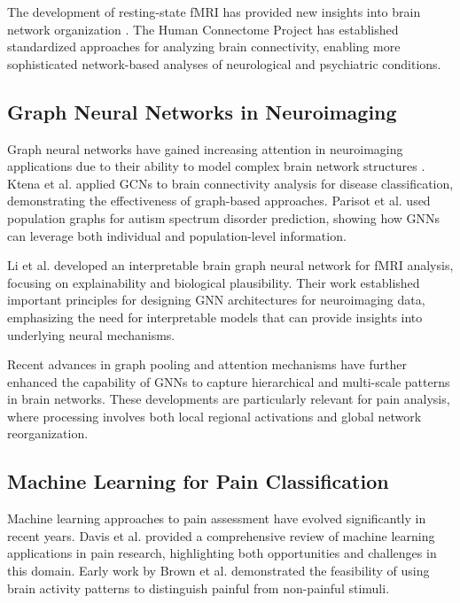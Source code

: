 \documentclass[10pt,journal,compsoc]{IEEEtran}
\begin{document}
The development of resting-state fMRI has provided new insights into brain network organization \cite{greicius2003functional,fox2009default}. The Human Connectome Project \cite{van2013human,smith2013resting} has established standardized approaches for analyzing brain connectivity, enabling more sophisticated network-based analyses of neurological and psychiatric conditions.

\subsection{Graph Neural Networks in Neuroimaging}

Graph neural networks have gained increasing attention in neuroimaging applications due to their ability to model complex brain network structures \cite{zhou2020graph}. Ktena et al. \cite{ktena2018distance} applied GCNs to brain connectivity analysis for disease classification, demonstrating the effectiveness of graph-based approaches. Parisot et al. \cite{parisot2018spectral} used population graphs for autism spectrum disorder prediction, showing how GNNs can leverage both individual and population-level information.

Li et al. \cite{li2021braingnn} developed an interpretable brain graph neural network for fMRI analysis, focusing on explainability and biological plausibility. Their work established important principles for designing GNN architectures for neuroimaging data, emphasizing the need for interpretable models that can provide insights into underlying neural mechanisms.

Recent advances in graph pooling \cite{gao2019graph} and attention mechanisms \cite{veličković2017graph} have further enhanced the capability of GNNs to capture hierarchical and multi-scale patterns in brain networks. These developments are particularly relevant for pain analysis, where processing involves both local regional activations and global network reorganization.

\subsection{Machine Learning for Pain Classification}

Machine learning approaches to pain assessment have evolved significantly in recent years. Davis et al. \cite{davis2020machine} provided a comprehensive review of machine learning applications in pain research, highlighting both opportunities and challenges in this domain. Early work by Brown et al. \cite{brown2011towards} demonstrated the feasibility of using brain activity patterns to distinguish painful from non-painful stimuli.
\end{document}
